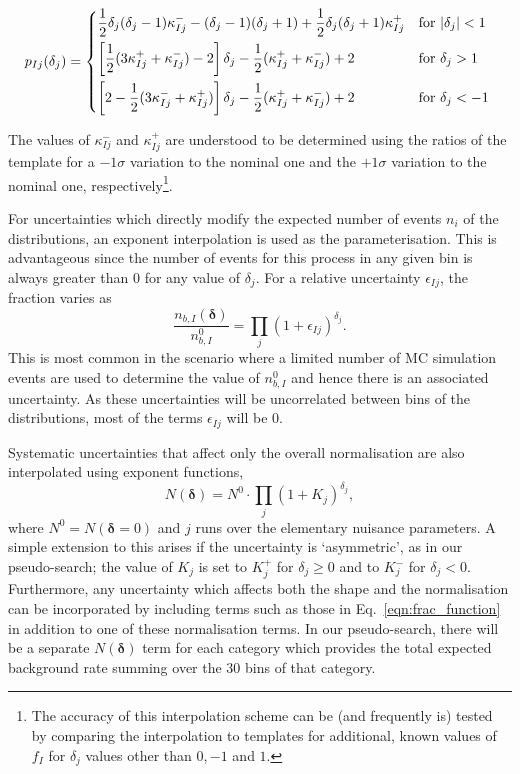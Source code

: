 \documentclass[11pt]{article}
\begin{document}
\begin{equation}
 p_{Ij}(\delta_{j}) = \begin{dcases*}
 		\frac{1}{2} \delta_{j}(\delta_{j}-1) \kappa_{Ij}^{-}  -(\delta_{j}-1)(\delta_{j}+1) + \frac{1}{2}\delta_{j}(\delta_{j}+1)\kappa_{Ij}^{+} & for $|\delta_{j}|<1$ \\
        \left[ \frac{1}{2}(3\kappa_{Ij}^{+} + \kappa_{Ij}^{-})-2\right]\delta_{j} - \frac{1}{2}(\kappa_{Ij}^{+}+\kappa_{Ij}^{-})+2 & for $\delta_{j}>1$ \\
         \left[2-\frac{1}{2}(3\kappa_{Ij}^{-} + \kappa_{Ij}^{+})\right]\delta_{j} - \frac{1}{2}(\kappa_{Ij}^{+}+\kappa_{Ij}^{-})+2 & for $\delta_{j}<-1$ \\
    \end{dcases*}
\end{equation}

The values of $\kappa_{Ij}^{-}$ and $\kappa_{Ij}^{+}$ are understood to be determined using the ratios of the template for a $-1\sigma$ variation to the nominal one and the $+1\sigma$
variation to the nominal one, respectively\footnote{The accuracy of this interpolation scheme can be (and frequently is) tested by comparing the interpolation to templates for additional, known values of $f_{I}$ for $\delta_{j}$ values other than $0,-1$ and $1$.}.

For uncertainties which directly modify the expected number of events $n_{i}$ of the distributions, an exponent interpolation is used as the parameterisation.
This is advantageous since the number of events for this process in any given bin is always greater than 0 for any value of $\delta_{j}$. For a relative uncertainty $\epsilon_{Ij}$, the fraction varies as
%
\begin{equation}
 \frac{n_{b,I}(\bm{\delta})}{n_{b,I}^{0}}  =  \prod_{j} (1+\epsilon_{Ij})^{\delta_{j}}.
  \label{eqn:bin_function}
\end{equation}
%
This is most common in the scenario where a limited number of MC simulation events are used to determine the value of $n_{b,I}^{0}$
and hence there is an associated uncertainty. As these uncertainties will be uncorrelated between bins of the distributions, most of the terms $\epsilon_{Ij}$ will be 0.

Systematic uncertainties that affect only the overall normalisation are also interpolated using exponent functions,
%
\begin{equation}
 N(\bm{\delta})  =   N^{0} \cdot \prod_{j} (1+K_{j})^{\delta_{j}},
 \label{eqn:norm_function}
\end{equation}
%
where $N^{0} = N(\bm{\delta}=0)$ and $j$ runs over the elementary nuisance parameters.  A simple extension to this arises if the uncertainty is `asymmetric', as in our pseudo-search;
the value of $K_{j}$ is set to $K^{+}_{j}$ for $\delta_{j}\geq0$ and to $K^{-}_{j}$ for $\delta_{j} < 0$. Furthermore, any uncertainty which affects both the
shape and the normalisation can be incorporated by including terms such as those in Eq.~\eqref{eqn:frac_function} in addition to one of these normalisation terms.
In our pseudo-search, there will be a separate $N(\bm{\delta})$ term for each category which provides the total expected background rate summing over the 30 bins of that category.
\end{document}
